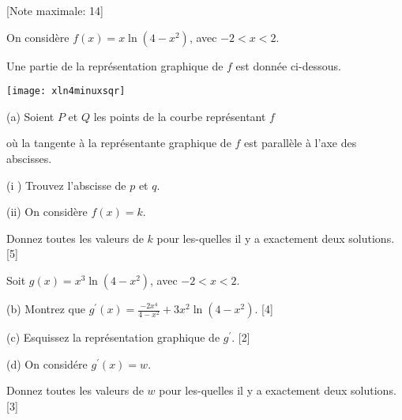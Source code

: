 \begin{question}
  \hspace*{\fill} [Note maximale: 14]\par
  \noindent On considère $f(x) = x\ln(4 - x^2)$, avec $-2 < x < 2$.\par
  \medskip
  \begin{center}
    \noindent Une partie de la représentation graphique de $f$ est donnée ci-dessous.\par
    \texttt{[image: xln4minuxsqr]}\par
  \end{center}\par
  (a) Soient $P$ et $Q$ les points de la courbe représentant $f$\par
  \hspace{1em} où la tangente à la représentante graphique de $f$ est parallèle à l'axe des abscisses.\par
  \hspace{1em} (i ) Trouvez l'abscisse de $p$ et $q$.\par 
  \hspace{1em} (ii) On considère $f(x) =k$.\par
  \hspace{3em} Donnez toutes les valeurs de $k$ pour les-quelles il y a exactement deux solutions.\hspace*{\fill} [5]\par
  \medskip
  Soit $g(x) = x^3\ln(4 - x^2)$, avec $-2 < x < 2$.\par
  \medskip
  (b) Montrez que $g^\prime(x)=\frac{-2x^4}{4 - x^2} + 3x^2\ln(4 - x^2)$.\hspace*{\fill} [4]\par
  \medskip
  (c) Esquissez la représentation graphique de $g^\prime$.\hspace*{\fill} [2]\par
  \medskip
  (d) On considére $g^\prime(x) = w$.\par
  \hspace{1em} Donnez toutes les valeurs de $w$ pour les-quelles il y a exactement deux solutions.\hspace*{\fill} [3]\par
  
\end{question}
